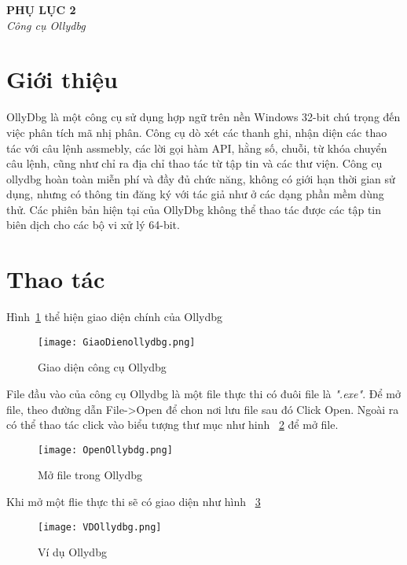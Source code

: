 \begin{center}
	\begin{huge}
			\textbf{PHỤ LỤC 2}\\
			\textit{Công cụ Ollydbg}
	\end{huge}
\end{center}

\section*{Giới thiệu}
	OllyDbg là một công cụ sử dụng hợp ngữ trên nền Windows 32-bit chú trọng đến việc phân tích mã nhị phân. Công cụ dò xét các thanh ghi, nhận diện các thao tác với câu lệnh assmebly, các lời gọi hàm API, hằng số, chuỗi, từ khóa chuyển câu lệnh, cũng như chỉ ra địa chỉ thao tác từ tập tin và các thư viện. Công cụ ollydbg hoàn toàn miễn phí và đầy đủ chức năng, không có giới hạn thời gian sử dụng, nhưng có thông tin đăng ký với tác giả như ở các dạng phần mềm dùng thử. Các phiên bản hiện tại của OllyDbg không thể thao tác được các tập tin biên dịch cho các bộ vi xử lý 64-bit.
	
\section*{Thao tác}
Hình~\ref{fig:GiaoDienOllydbg} thể hiện giao diện chính của Ollydbg
	\begin{center}
			\begin{figure}[htp]
				\begin{center}
					\texttt{[image: GiaoDienollydbg.png]}
				\end{center}
				\caption{Giao diện công cụ Ollydbg}	
					\label{fig:GiaoDienOllydbg}		
			\end{figure}
		\end{center}		

File đầu vào của công cụ Ollydbg là một file thực thi có đuôi file là \textit{".exe"}. Để mở file, theo đường dẫn File->Open để chon nơi lưu file sau đó Click Open. Ngoài ra có thể thao tác click vào biểu tượng thư mục như hinh ~\ref{fig:OpenOllydbg} để mở file.
		\begin{center}
			\begin{figure}[htp]
				\begin{center}
					\texttt{[image: OpenOllybdg.png]}
				\end{center}
				\caption{Mở file trong Ollydbg}	
					\label{fig:OpenOllydbg}		
			\end{figure}
		\end{center}		
Khi mở một flie thực thi sẽ có giao diện như hình ~\ref{fig:VDOllydbg}
	\begin{center}
			\begin{figure}[htp]
				\begin{center}
					\texttt{[image: VDOllydbg.png]}
				\end{center}
				\caption{Ví dụ Ollydbg}	
					\label{fig:VDOllydbg}		
			\end{figure}
		\end{center}		
		
